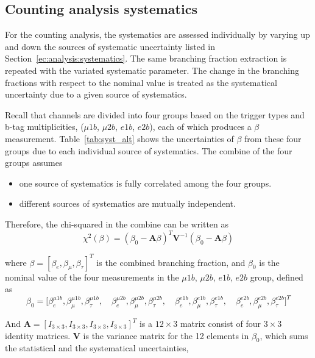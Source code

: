 \FloatBarrier



\subsection{Counting analysis systematics}

For the counting analysis, the systematics are assessed individually by
varying up and down the sources of systematic uncertainty listed in
Section~\ref{ec:analysis:systematics}. The same branching fraction 
extraction is repeated with the variated systematic parameter.
The change in the branching fractions 
with respect to the nominal value is treated as the systematical uncertainty
due to a given source of systematics.

Recall that channels are divided into 
four groups based on the trigger types and b-tag multiplicities,
($\mu1b$, $\mu2b$, $e1b$, $e2b$), each of which produces a $\beta$ measurement. 
Table~\ref{tab:syst_alt} shows the 
uncertainties of $\beta$ from these four groups due to each individual source of systematics.
The combine of the four groups assumes
\begin{itemize}
    \item one source of systematics is fully correlated among the four groups.
    \item different sources of systematics are mutually independent.
\end{itemize}

\noindent Therefore, the chi-squared in the combine can be written as
\begin{equation}
    \chi^2 (\beta) = (\beta_0 - \textbf{A} \beta )^T \textbf{V}^{-1} (\beta_0 - \textbf{A} \beta )
\end{equation}

\noindent where $\beta = [\beta_e, \beta_\mu, \beta_\tau]^T $ is the combined branching fraction, and
$\beta_0$ is the nominal value of the four measurements in the $\mu1b$, $\mu2b$, $e1b$, $e2b$ group, defined as
% 
\begin{equation}
    \beta_0 = \bigg [
    \beta_e^{\mu1b}, \beta_\mu^{\mu1b}, \beta_\tau^{\mu1b}, \quad 
    \beta_e^{\mu2b}, \beta_\mu^{\mu2b}, \beta_\tau^{\mu2b}, \quad 
    \beta_e^{e1b}, \beta_\mu^{e1b}, \beta_\tau^{e1b}, \quad
    \beta_e^{e2b}, \beta_\mu^{e2b}, \beta_\tau^{e2b}
    \bigg ]^T
\end{equation}

\noindent And $\textbf{A}=[I_{3\times3}, I_{3\times3}, I_{3\times3}, I_{3\times3}]^T$ is a $12 \times 3$ 
matrix consist of four $3\times 3$ identity matrices. $\textbf{V}$ is the variance matrix for the 12 
elements in $\beta_0$, which sums the statistical and the systematical uncertainties,


